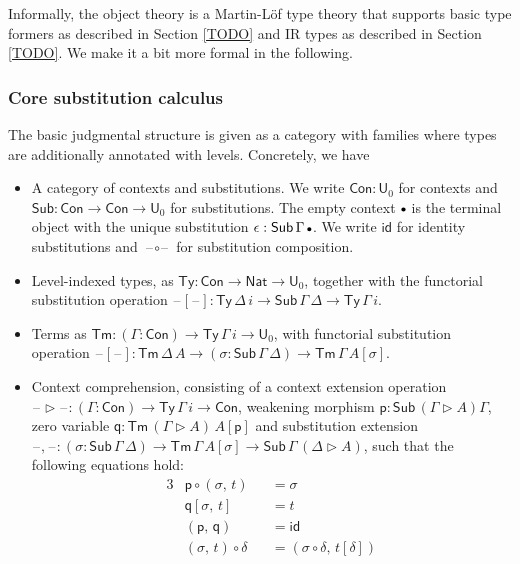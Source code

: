 \documentclass[acmsmall,screen,review,anonymous]{acmart}
\newcommand{\msf}[1]{{\mathsf{#1}}}
\newcommand{\p}{\mathsf{p}}
\newcommand{\q}{\mathsf{q}}
\newcommand{\U}{\msf{U}}
\newcommand{\Nat}{\msf{Nat}}
\newcommand{\blank}{{\mathord{\hspace{1pt}\text{--}\hspace{1pt}}}}
\newcommand{\emptycon}{\scaleobj{.75}\bullet}
\newcommand{\id}{\msf{id}}
\newcommand{\Con}{\msf{Con}}
\newcommand{\Sub}{\msf{Sub}}
\newcommand{\Ty}{\msf{Ty}}
\newcommand{\Tm}{\msf{Tm}}
\newcommand{\ext}{\triangleright}
\begin{document}
Informally, the object theory is a Martin-Löf type theory that supports
basic type formers as described in Section \ref{TODO} and IR types as described
in Section \ref{TODO}. We make it a bit more formal in the following.

\subsubsection{Core substitution calculus} The basic judgmental structure is given
as a category with families \cite{TODO} where types are additionally annotated with levels.
Concretely, we have
\begin{itemize}
\item A category of contexts and substitutions. We write $\Con : \U_0$ for contexts and $\Sub : \Con \to \Con \to \U_0$
  for substitutions. The empty context $\emptycon$ is the terminal object with the unique substitution $\epsilon : \Sub\,\Gamma\,\emptycon$.
  We write $\id$ for identity substitutions and $\blank\!\circ\!\blank$ for substitution composition.
\item Level-indexed types, as $\Ty : \Con \to \Nat \to \U_0$, together with the functorial substitution operation
      $\blank[\blank] : \Ty\,\Delta\,i \to \Sub\,\Gamma\,\Delta \to \Ty\,\Gamma\,i$.
\item Terms as $\Tm : (\Gamma : \Con) \to \Ty\,\Gamma\,i \to \U_0$, with functorial substitution operation
  $\blank[\blank] : \Tm\,\Delta\,A \to (\sigma : \Sub\,\Gamma\,\Delta) \to \Tm\,\Gamma\,A[\sigma]$.
\item Context comprehension, consisting of a context extension operation $\blank\!\ext\!\blank : (\Gamma : \Con) \to \Ty\,\Gamma\,i \to \Con$,
  weakening morphism $\p : \Sub\,(\Gamma\ext A) \Gamma$, zero variable $\q : \Tm\,(\Gamma\ext A)\,A[\p]$ and substitution extension $\blank\!,\!\blank : (\sigma : \Sub\,\Gamma\,\Delta) \to \Tm\,\Gamma\,A[\sigma] \to \Sub\,\Gamma\,(\Delta\ext A)$, such that the following equations hold:
  \begin{alignat*}{3}
    &\p \circ (\sigma,\,t)     &&= \sigma \\
    &\q[\sigma,\,t]            &&= t \\
    &(\p,\,\q)                 &&= \id \\
    &(\sigma,\,t) \circ \delta &&= (\sigma \circ \delta,\,t[\delta])
  \end{alignat*}


\end{itemize}
\end{document}
